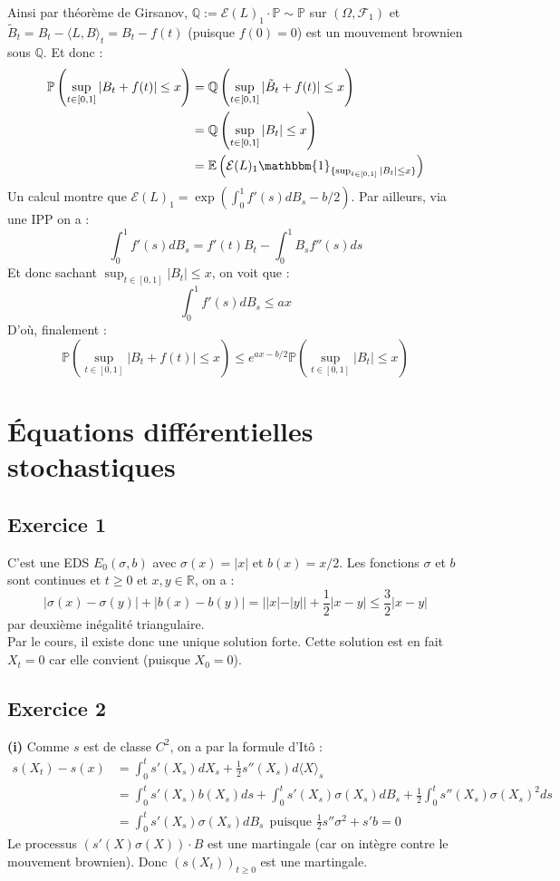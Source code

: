 \documentclass[a4paper,12pt]{article}
\newcommand{\E}{\mathbb{E}}
\newcommand{\prob}{\mathbb{P}}
\newcommand{\ind}{\mathbbm{1}}
\newcommand{\f}{\mathcal{F}}
\newcommand{\sme}{\mathcal{E}}
\begin{document}
Ainsi par théorème de Girsanov, $\mathbb{Q} := \sme(L)_1 \cdot \prob \sim \prob$ sur $(\Omega, \f_1)$ et $\tilde{B}_t = B_t - \langle L, B \rangle_t = B_t-f(t)$ (puisque $f(0)=0$) est un mouvement brownien sous $\mathbb{Q}$. Et donc :
\begin{align*}
\prob \left( \sup_{t \in [0,1]} |B_t + f(t)| \leq x \right) & = \mathbb{Q} \left( \sup_{t \in [0,1]} |\tilde{B}_t + f(t)| \leq x \right) \\
& = \mathbb{Q} \left( \sup_{t \in [0,1]} |B_t| \leq x \right) \\
& = \E \left( \sme (L)_1 \ind_{\{ \sup_{t \in [0,1]} |B_t| \leq x \}} \right)
\end{align*}
Un calcul montre que $\sme (L)_1 = \exp{\left( \int_0^1 f'(s) dB_s - b/2 \right)}$. Par ailleurs, via une IPP on a :
$$\int_0^1 f'(s) dB_s = f'(t) B_t - \int_0^1 B_s f''(s) ds$$
Et donc sachant $\sup_{t \in [0,1]} |B_t| \leq x$, on voit que :
$$\int_0^1 f'(s) dB_s \leq ax$$
D'où, finalement :
$$\prob \left( \sup_{t \in [0,1]} |B_t + f(t)| \leq x \right) \leq e^{ax-b/2} \prob \left( \sup_{t \in [0,1]} |B_t| \leq x \right)$$


\section{Équations différentielles stochastiques}
\subsection{Exercice 1} 
C'est une EDS $E_0 (\sigma, b)$ avec $\sigma(x)=|x|$ et $b(x)=x/2$. Les fonctions $\sigma$ et $b$ sont continues et $t \geq 0$ et $x,y \in \mathbb{R}$, on a :
$$|\sigma(x)-\sigma (y)| + |b(x)-b(y)| = ||x|-|y|| + \frac{1}{2} |x-y| \leq \frac{3}{2} |x-y|$$
par deuxième inégalité triangulaire. \\

Par le cours, il existe donc une unique solution forte. Cette solution est en fait $X_t=0$ car elle convient (puisque $X_0=0$).

\subsection{Exercice 2}
\textbf{(i)} Comme $s$ est de classe $C^2$, on a par la formule d'Itô :
\begin{align*}
s(X_t)-s(x) & = \int_0^t s'(X_s) dX_s + \frac{1}{2} s''(X_s) d\langle X \rangle_s \\
& = \int_0^t s'(X_s) b(X_s) ds + \int_0^t s'(X_s) \sigma (X_s) dB_s + \frac{1}{2} \int_0^t s''(X_s) \sigma (X_s)^2 ds \\
& = \int_0^t s'(X_s) \sigma (X_s) dB_s \ \ \text{puisque } \frac{1}{2} s'' \sigma^2 + s' b = 0
\end{align*}
Le processus $(s'(X)\sigma(X))\cdot B$ est une martingale (car on intègre contre le mouvement brownien). Donc $(s(X_t))_{t \geq 0}$ est une martingale. \\
\end{document}
